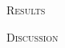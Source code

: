 \documentclass[12pt,letterpaper]{article}
\renewcommand{\section}[1]{%
\bigskip
\begin{center}
\begin{Large}
\normalfont\scshape #1
\medskip
\end{Large}
\end{center}}
\begin{document}
%
%

\section{Results}

%
%

\section{Discussion}




%
%
\end{document}
